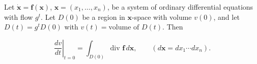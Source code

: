 Let $\dot{\mathbf{x}} = \mathbf{f}(\mathbf{x})$, $\mathbf{x} = (x_1, \ldots, x_n)$, be a system of ordinary differential equations with flow $g^t$. Let $D(0)$ be a region in $\mathbf{x}$-space with volume $v(0)$, and let $D(t) = g^t D(0)$ with $v(t) = \text{volume of } D(t)$. Then

$$\left. \frac{dv}{dt} \right|_{t=0} = \int_{D(0)} \text{div } \mathbf{f} \, d\mathbf{x}, \qquad (d\mathbf{x} = dx_1 \cdots dx_n).$$
